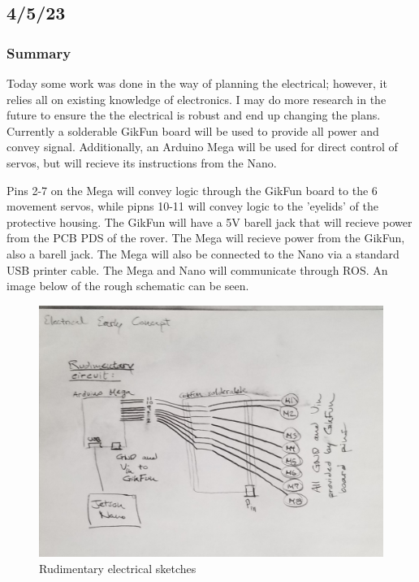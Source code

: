 \documentclass[a4paper, 10pt]{article}
\begin{document}
	\subsection{4/5/23}
		\subsubsection{Summary}
		Today some work was done in the way of planning the electrical; however, it relies all on existing knowledge of electronics. I may do more research in the future to ensure the the electrical is robust and end up changing the plans. Currently a solderable GikFun board will be used to provide all power and convey signal. Additionally, an Arduino Mega will be used for direct control of servos, but will recieve its instructions from the Nano. 
		
		Pins 2-7 on the Mega will convey logic through the GikFun board to the 6 movement servos, while pipns 10-11 will convey logic to the 'eyelids' of the protective housing. The GikFun will have a 5V barell jack that will recieve power from the PCB PDS of the rover. The Mega will recieve power from the GikFun, also a barell jack. The Mega will also be connected to the Nano via a standard USB printer cable. The Mega and Nano will communicate through ROS. An image below of the rough schematic can be seen.
		
		\begin{figure} [h]
			\centering
			\includegraphics[scale=0.2]{early_electrical}
			\caption{Rudimentary electrical sketches}
			\label{basic_electrical}
		\end{figure}
		
\end{document}
